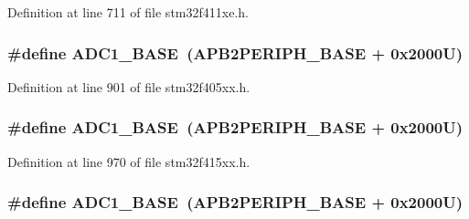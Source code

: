 Definition at line 711 of file stm32f411xe.\+h.

\subsubsection[{\texorpdfstring{A\+D\+C1\+\_\+\+B\+A\+SE}{ADC1_BASE}}]{\setlength{\rightskip}{0pt plus 5cm}\#define A\+D\+C1\+\_\+\+B\+A\+SE~({\bf A\+P\+B2\+P\+E\+R\+I\+P\+H\+\_\+\+B\+A\+SE} + 0x2000\+U)}\hypertarget{group___peripheral__registers__structures_ga695c9a2f892363a1c942405c8d351b91}{}\label{group___peripheral__registers__structures_ga695c9a2f892363a1c942405c8d351b91}


Definition at line 901 of file stm32f405xx.\+h.

\subsubsection[{\texorpdfstring{A\+D\+C1\+\_\+\+B\+A\+SE}{ADC1_BASE}}]{\setlength{\rightskip}{0pt plus 5cm}\#define A\+D\+C1\+\_\+\+B\+A\+SE~({\bf A\+P\+B2\+P\+E\+R\+I\+P\+H\+\_\+\+B\+A\+SE} + 0x2000\+U)}\hypertarget{group___peripheral__registers__structures_ga695c9a2f892363a1c942405c8d351b91}{}\label{group___peripheral__registers__structures_ga695c9a2f892363a1c942405c8d351b91}


Definition at line 970 of file stm32f415xx.\+h.

\subsubsection[{\texorpdfstring{A\+D\+C1\+\_\+\+B\+A\+SE}{ADC1_BASE}}]{\setlength{\rightskip}{0pt plus 5cm}\#define A\+D\+C1\+\_\+\+B\+A\+SE~({\bf A\+P\+B2\+P\+E\+R\+I\+P\+H\+\_\+\+B\+A\+SE} + 0x2000\+U)}\hypertarget{group___peripheral__registers__structures_ga695c9a2f892363a1c942405c8d351b91}{}\label{group___peripheral__registers__structures_ga695c9a2f892363a1c942405c8d351b91}


